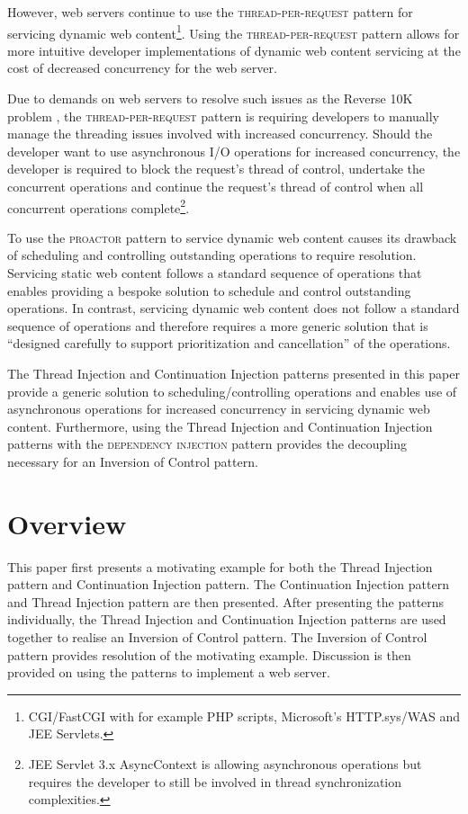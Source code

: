 \documentclass[prodmode]{style/acmlarge}
\begin{document}
However, web servers continue to use the \textsc{thread-per-request} pattern for
servicing dynamic web content\footnote{CGI/FastCGI with for example PHP scripts,
Microsoft's HTTP.sys/WAS and JEE Servlets.}.  Using the
\textsc{thread-per-request} pattern allows for more intuitive developer
implementations of dynamic web content servicing at the cost of decreased
concurrency for the web server.

Due to demands on web servers to resolve such issues as the Reverse 10K problem
\cite{reverse-ten-k-problem}, the \textsc{thread-per-request} pattern is
requiring developers to manually manage the threading issues involved with
increased concurrency.  Should the developer want to use asynchronous I/O
operations for increased concurrency, the developer is required to block the
request's thread of control, undertake the concurrent operations and continue
the request's thread of control when all concurrent operations
complete\footnote{JEE Servlet 3.x AsyncContext is allowing asynchronous
operations but requires the developer to still be involved in thread
synchronization complexities.}.

To use the \textsc{proactor} pattern to service dynamic web content causes its
drawback of scheduling and controlling outstanding operations \cite[p.
8]{proactor} to require resolution.  Servicing static web content follows a
standard sequence of operations that enables providing a bespoke solution to
schedule and control outstanding operations.  In contrast, servicing dynamic web
content does not follow a standard sequence of operations and therefore requires
a more generic solution that is ``designed carefully to support prioritization
and cancellation'' \cite[p. 8]{proactor} of the operations.

The Thread Injection and Continuation Injection patterns presented in this paper
provide a generic solution to scheduling/controlling operations and enables use
of asynchronous operations for increased concurrency in servicing dynamic web
content.  Furthermore, using the Thread Injection and Continuation Injection
patterns with the \textsc{dependency injection} pattern \cite{ioc} provides the
decoupling necessary for an Inversion of Control pattern.


\section{Overview}

This paper first presents a motivating example for both the Thread Injection
pattern and Continuation Injection pattern.  The Continuation Injection pattern
and Thread Injection pattern are then presented.  After presenting the patterns
individually, the Thread Injection and Continuation Injection patterns are used
together to realise an Inversion of Control pattern.  The Inversion of Control
pattern provides resolution of the motivating example.  Discussion is then
provided on using the patterns to implement a web server.
\end{document}
